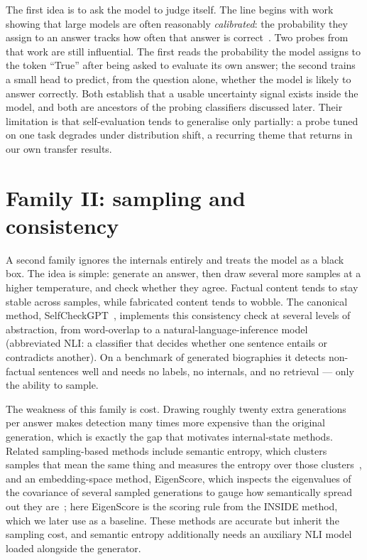 The first idea is to ask the model to judge itself. The line begins with work showing
that large models are often reasonably \emph{calibrated}: the probability they assign to
an answer tracks how often that answer is correct~\cite{kadavath2022know}. Two probes
from that work are still influential. The first reads the probability the model assigns
to the token ``True'' after being asked to evaluate its own answer; the second trains a
small head to predict, from the question alone, whether the model is likely to answer
correctly. Both establish that a usable uncertainty signal exists inside the model, and
both are ancestors of the probing classifiers discussed later. Their limitation is that
self-evaluation tends to generalise only partially: a probe tuned on one task degrades
under distribution shift, a recurring theme that returns in our own transfer results.

\section{Family II: sampling and consistency}

A second family ignores the internals entirely and treats the model as a black box. The
idea is simple: generate an answer, then draw several more samples at a higher
temperature, and check whether they agree. Factual content tends to stay stable across
samples, while fabricated content tends to wobble. The canonical method,
SelfCheckGPT~\cite{manakul2023selfcheckgpt}, implements this consistency check at several
levels of abstraction, from word-overlap to a natural-language-inference model
(abbreviated NLI: a classifier that decides whether one sentence entails or contradicts
another). On a benchmark of generated biographies it detects non-factual sentences well
and needs no labels, no internals, and no retrieval --- only the ability to sample.

The weakness of this family is cost. Drawing roughly twenty extra generations per answer
makes detection many times more expensive than the original generation, which is exactly
the gap that motivates internal-state methods. Related sampling-based methods include
semantic entropy, which clusters samples that mean the same thing and measures the
entropy over those clusters~\cite{kuhn2023semantic}, and an embedding-space method,
EigenScore, which inspects the eigenvalues of the covariance of several sampled
generations to gauge how semantically spread out they are~\cite{chen2024inside}; here
EigenScore is the scoring rule from the INSIDE method, which we later use as a baseline.
These methods are accurate but inherit the sampling cost, and semantic entropy
additionally needs an auxiliary NLI model loaded alongside the generator.

